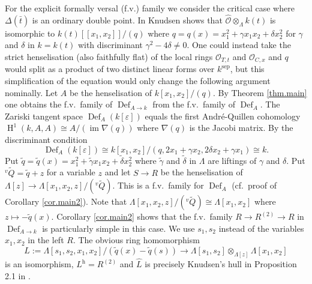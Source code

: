 \documentclass[a4paper,10pt]{amsart}
\theoremstyle{plain}
\theoremstyle{definition}
\theoremstyle{remark}
\numberwithin{equation}{xx}
\DeclareMathOperator{\Def}{Def}
\DeclareMathOperator{\cH}{H}
\DeclareMathOperator{\im}{im}
\newcommand{\ra}{\rightarrow}
\newcommand{\lra}{\longrightarrow}
\newcommand{\ot}{{\otimes}}
\newcommand{\vare}{\varepsilon}
\newcommand{\vL}{\varLambda}
\newcommand{\df}[2]{{\Def}_{#2}^{#1}}
\newcommand{\Q}{\mathcal{O}}
\begin{document}
For the explicit formally versal (f.v.) family we consider the critical case where \(\Delta(\bar{t})\) is an ordinary double point. In \cite{knu:12} Knudsen shows that \(\hat{\Q}\ot_{\vL}k(t)\) is isomorphic to \(k(t)[[x_{1},x_{2}]]/(q)\) where \(q=q(x)=x_{1}^{2}+\gamma x_{1}x_{2}+\delta x_{2}^{2}\) for \(\gamma\) and \(\delta\) in \(k=k(t)\) with discriminant \(\gamma^{2}-4\delta\neq 0\). One could instead take the strict henselisation (also faithfully flat) of the local rings \(\Q_{T,t}\) and \(\Q_{C,x}\) and \(q\) would split as a product of two distinct linear forms over \(k^{\text{sep}}\), but this simplification of the equation would only change the following argument nominally. Let \(A\) be the henselisation of \(k[x_{1},x_{2}]/(q)\). By Theorem \ref{thm.main} one obtains the f.v.\ family of \(\df{}{A\ra k}\) from the f.v.\ family of \(\df{}{A}\). The Zariski tangent space \(\df{}{A}(k[\vare])\) equals the first Andr{\'e}-Quillen cohomology \(\cH^{1}(k,A,A) \cong A/(\im\nabla(q))\) where \(\nabla(q)\) is the Jacobi matrix. By the discriminant condition  
\begin{equation}
\df{}{A}(k[\vare])\cong k[x_{1},x_{2}]/(q,2x_{1}+\gamma x_{2},2\delta x_{2}+\gamma x_{1})\cong k. 
\end{equation}
Put \(\tilde{q}=\tilde{q}(x)=x_{1}^{2}+\tilde\gamma x_{1}x_{2} + \tilde{\delta}x_{2}^{2}\) where \(\tilde{\gamma}\) and \(\tilde{\delta}\) in \(\vL\) are liftings of \(\gamma\) and \(\delta\). Put \({}^{v}\tilde{Q}=\tilde{q}+z\) for a variable \(z\) and let \(S\ra R\) be the henselisation of \(\vL[z]\ra\vL[x_{1},x_{2},z]/({}^{v}\tilde{Q})\). This is a f.v.\ family for \(\df{}{A}\) (cf.\ proof of Corollary \ref{cor.main2}). Note that \(\vL[x_{1},x_{2},z]/({}^{v}\tilde{Q})\cong\vL[x_{1},x_{2}]\) where \(z\mapsto -\tilde{q}(x)\). Corollary \ref{cor.main2} shows that the f.v.\ family \(R\ra R^{(2)}\ra R\) in \(\df{}{A\ra k}\) is particularly simple in this case. We use \(s_{1},s_{2}\) instead of the variables \(x_{1},x_{2}\) in the left \(R\).  The obvious ring homomorphism 
\begin{equation}
L:=\vL[s_{1},s_{2},x_{1},x_{2}]/(\tilde{q}(x)-\tilde{q}(s))\lra \vL[s_{1},s_{2}]\ot_{\vL[z]}\vL[x_{1},x_{2}]
\end{equation}
is an isomorphism, \(L^{\text{h}}=R^{(2)}\) and \(\hat{L}\) is precisely Knudsen's hull in Proposition 2.1 in \cite{knu:12}.
\end{document}
